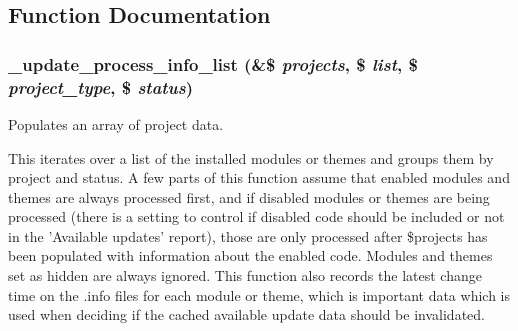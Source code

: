\subsection{Function Documentation}
\hypertarget{update_8compare_8inc_a37eb8774bbb961b5d1113c116aba2f3b}{
\subsubsection[{\_\-update\_\-process\_\-info\_\-list}]{\setlength{\rightskip}{0pt plus 5cm}\_\-update\_\-process\_\-info\_\-list (\&\$ {\em projects}, \/  \$ {\em list}, \/  \$ {\em project\_\-type}, \/  \$ {\em status})}}
\label{update_8compare_8inc_a37eb8774bbb961b5d1113c116aba2f3b}
Populates an array of project data.

This iterates over a list of the installed modules or themes and groups them by project and status. A few parts of this function assume that enabled modules and themes are always processed first, and if disabled modules or themes are being processed (there is a setting to control if disabled code should be included or not in the 'Available updates' report), those are only processed after \$projects has been populated with information about the enabled code. Modules and themes set as hidden are always ignored. This function also records the latest change time on the .info files for each module or theme, which is important data which is used when deciding if the cached available update data should be invalidated.


